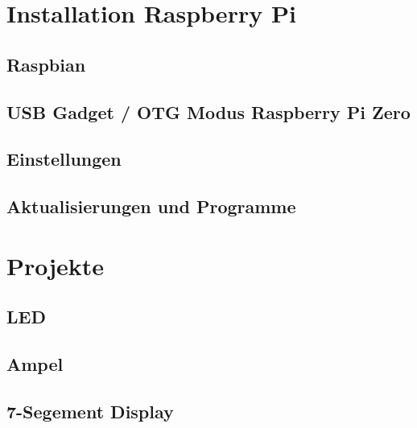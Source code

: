 \maketitle

\tableofcontents

\chapter{Installation Raspberry Pi}

\section{Raspbian}



\section{USB Gadget / OTG Modus Raspberry Pi Zero}



\section{Einstellungen}



\section{Aktualisierungen und Programme}



\clearpage


\clearpage


\chapter{Projekte} \label{Projekte}

\section{LED}


\clearpage
\section{Ampel}


\clearpage
\section{7-Segement Display}


